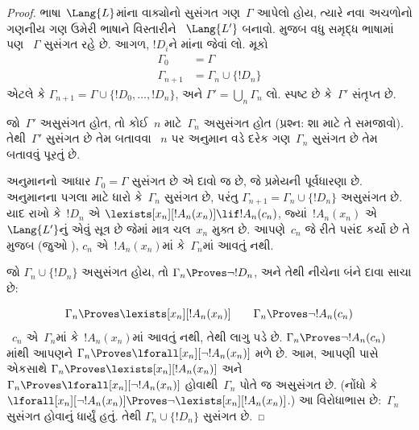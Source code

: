 \begin{proof}
ભાષા~$\Lang{L}$માંના વાક્યોનો સુસંગત ગણ~$\Gamma$ આપેલો હોય, ત્યારે
નવા અચળોનો ગણનીય ગણ ઉમેરી ભાષાને વિસ્તારીને
~$\Lang{L'}$ બનાવો.  મુજબ વધુ સમૃદ્ધ ભાષામાં પણ
~$\Gamma$ સુસંગત રહે છે. આગળ, $!D_i$ને માંના
જેવાં લો. મૂકો
\begin{align*}
\Gamma_0 & = \Gamma \\
\Gamma_{n+1} & = \Gamma_n \cup \{!D_n \}
\end{align*}
એટલે કે $\Gamma_{n+1}=\Gamma\cup\{!D_0,\dots,!D_n\}$, અને
$\Gamma'=\bigcup_{n}\Gamma_n$ લો. સ્પષ્ટ છે કે~$\Gamma'$ સંતૃપ્ત છે.

જો~$\Gamma'$ અસુસંગત હોત, તો કોઈ~$n$ માટે~$\Gamma_n$ અસુસંગત હોત
(પ્રશ્ન: શા માટે તે સમજાવો). તેથી~$\Gamma'$ સુસંગત છે તેમ બતાવવા
~$n$ પર અનુમાન વડે દરેક ગણ~$\Gamma_n$ સુસંગત છે તેમ બતાવવું પૂરતું છે.

અનુમાનનો આધાર $\Gamma_0=\Gamma$ સુસંગત છે એ દાવો જ છે, જે પ્રમેયની
પૂર્વધારણા છે. અનુમાનના પગલા માટે ધારો કે~$\Gamma_{n}$ સુસંગત છે, પરંતુ
$\Gamma_{n+1}=\Gamma_n\cup\{!D_n\}$ અસુસંગત છે. યાદ રાખો કે~$!D_n$ એ
$\lexists[x_{n}][!A_{n}(x_n)] \lif !A_{n}(c_{n})$,
જ્યાં~$!A_n(x_n)$ એ~$\Lang{L'}$નું એવું સૂત્ર છે જેમાં માત્ર
ચલ~$x_n$ મુક્ત છે. આપણે~$c_n$ જે રીતે પસંદ કર્યો છે તે મુજબ (જુઓ
), $c_n$ એ~$!A_n(x_n)$માં કે~$\Gamma_n$માં
આવતું નથી.

જો $\Gamma_n\cup\{!D_n\}$ અસુસંગત હોય, તો $\Gamma_n\Proves\lnot
!D_n$, અને તેથી નીચેના બંને દાવા સાચા છે:

\[
\Gamma_n \Proves \lexists[x_n][!A_n(x_n)]
\qquad
\Gamma_n \Proves \lnot !A_n(c_n)
\]
~$c_n$ એ~$\Gamma_n$માં કે~$!A_n(x_n)$માં આવતું નથી, તેથી
લાગુ પડે છે.
$\Gamma_n \Proves \lnot !A_n(c_n)$
માંથી આપણને
$\Gamma_n \Proves \lforall[x_n][\lnot !A_n(x_n)]$
મળે છે. આમ, આપણી પાસે એકસાથે
$\Gamma_n \Proves \lexists[x_n][!A_n(x_n)]$ અને
$\Gamma_n \Proves \lforall[x_n][\lnot !A_n(x_n)]$
હોવાથી~$\Gamma_n$ પોતે જ અસુસંગત છે.
(નોંધો કે
$\lforall[x_n][\lnot !A_n(x_n)] \Proves
  \lnot\lexists[x_n][!A_n(x_n)]$.)
આ વિરોધાભાસ છે:~$\Gamma_n$ સુસંગત હોવાનું ધાર્યું હતું. તેથી
$\Gamma_n\cup\{!D_n\}$ સુસંગત છે.
\end{proof}


